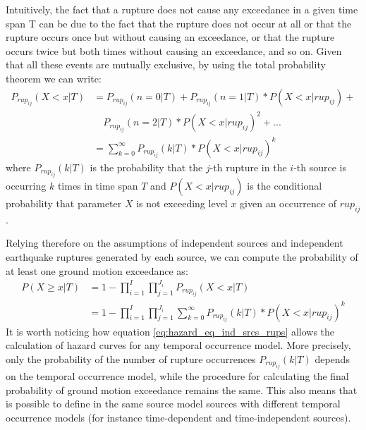 Intuitively, the fact that a rupture does not cause any
exceedance in a given time span T can be due to the fact that the rupture does not occur at all or that the
rupture occurs once but without causing an exceedance, or that the rupture occurs twice but both times
without causing an exceedance, and so on. Given that all these events are mutually exclusive, by using the
total probability theorem we can write:
\begin{align}
\label{eq:prup_noexceed_rup}
P_{rup_{ij}}(X < x | T) & = P_{rup_{ij}}(n = 0 | T) + P_{rup_{ij}}(n = 1 | T) * P(X < x | rup_{ij}) + \nonumber \\
                                &\quad	P_{rup_{ij}}(n = 2 | T) * P(X < x | rup_{ij})^{2}  + ... \nonumber \\
				 & = \sum_{k=0}^{\infty} P_{rup_{ij}}(k | T) * P(X < x | rup_{ij}) ^ {k} 
\end{align}
where $P_{rup_{ij}}(k | T)$ is the probability that the $j$-th rupture in the $i$-th source is occurring $k$ times in time span $T$ and
$P(X < x | rup_{ij})$ is the conditional probability that parameter $X$ is not exceeding level $x$ given an
occurrence of $rup_{ij}$. 

Relying therefore on the assumptions of independent sources and independent earthquake ruptures generated by each source, we can compute
the probability of at least one ground motion exceedance as:
\begin{align}
\label{eq:hazard_eq_ind_srcs_rups}
P(X \ge x | T) & =  1 - \prod_{i=1}^{I} \prod_{j=1}^{J_{i}} P_{rup_{ij}}(X < x | T) \nonumber \\
                     & = 1 - \prod_{i=1}^{I} \prod_{j=1}^{J_{i}} \sum_{k=0}^{\infty} P_{rup_{ij}}(k | T) * P(X < x | rup_{ij}) ^ {k} 
\end{align}
It is worth noticing how equation \ref{eq:hazard_eq_ind_srcs_rups} allows the calculation of hazard curves for any
temporal occurrence model. More precisely, only the probability of the number of rupture occurrences $P_{rup_{ij}}(k | T)$
depends on the temporal occurrence model, while the procedure for calculating the final probability of ground motion exceedance
remains the same. This also means that is possible to define in the same source model sources with different temporal occurrence
models (for instance time-dependent and time-independent sources).

